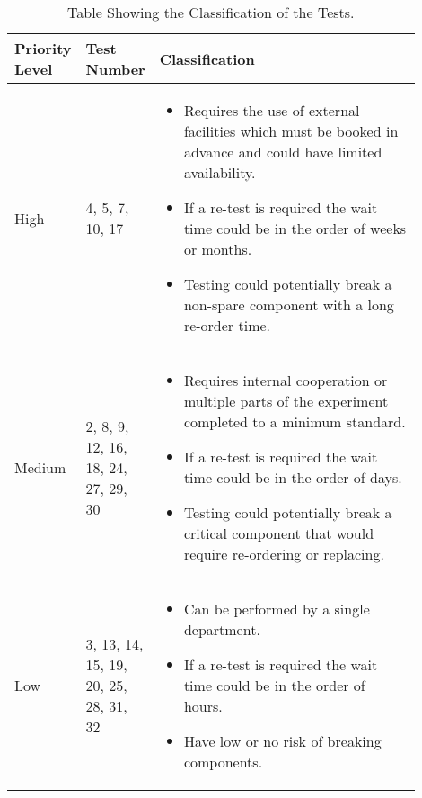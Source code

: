 \begin{table}[H]
\centering
\begin{tabular}{|p{0.1\linewidth}|p{0.1\linewidth}|p{0.7\linewidth}|}
\hline
\textbf{Priority Level} & \textbf{Test Number} & \textbf{Classification} \\ \hline
High & 4, 5, 7, 10, 17 & \begin{itemize}
    \item Requires the use of external facilities which must be booked in advance and could have limited availability.
    \item If a re-test is required the wait time could be in the order of weeks or months.
    \item Testing could potentially break a non-spare component with a long re-order time.
\end{itemize}\\ \hline
Medium & 2, 8, 9, 12, 16, 18, 24, 27, 29, 30 & \begin{itemize}
    \item Requires internal cooperation or multiple parts of the experiment completed to a minimum standard.
    \item If a re-test is required the wait time could be in the order of days.
    \item Testing could potentially break a critical component that would require re-ordering or replacing.
\end{itemize} \\ \hline
Low & 3, 13, 14, 15, 19, 20, 25, 28, 31, 32 & \begin{itemize}
    \item Can be performed by a single department.
    \item If a re-test is required the wait time could be in the order of hours.
    \item Have low or no risk of breaking components.
\end{itemize} \\ \hline
\end{tabular}
\caption{Table Showing the Classification of the Tests.}
\label{tab:classification}
\end{table}

\raggedbottom
